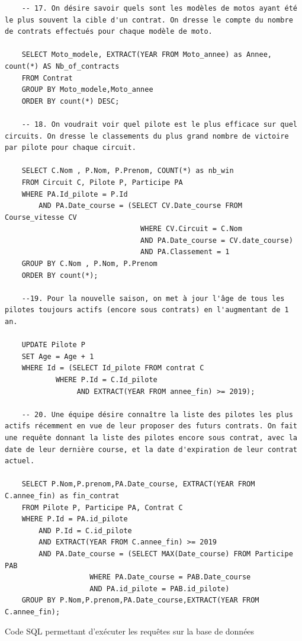 \documentclass[12pt,a4paper]{article}
\newenvironment{code}{\captionsetup{type=listing}}{}
\begin{document}
\begin{code}
\begin{verbatim}
    -- 17. On désire savoir quels sont les modèles de motos ayant été le plus souvent la cible d'un contrat. On dresse le compte du nombre de contrats effectués pour chaque modèle de moto.

    SELECT Moto_modele, EXTRACT(YEAR FROM Moto_annee) as Annee, count(*) AS Nb_of_contracts
    FROM Contrat
    GROUP BY Moto_modele,Moto_annee
    ORDER BY count(*) DESC;
    
    -- 18. On voudrait voir quel pilote est le plus efficace sur quel circuits. On dresse le classements du plus grand nombre de victoire par pilote pour chaque circuit.

    SELECT C.Nom , P.Nom, P.Prenom, COUNT(*) as nb_win
    FROM Circuit C, Pilote P, Participe PA
    WHERE PA.Id_pilote = P.Id
        AND PA.Date_course = (SELECT CV.Date_course FROM Course_vitesse CV
                                WHERE CV.Circuit = C.Nom
                                AND PA.Date_course = CV.date_course)
                                AND PA.Classement = 1
    GROUP BY C.Nom , P.Nom, P.Prenom
    ORDER BY count(*);
        
    --19. Pour la nouvelle saison, on met à jour l'âge de tous les pilotes toujours actifs (encore sous contrats) en l'augmentant de 1 an.

    UPDATE Pilote P
    SET Age = Age + 1
    WHERE Id = (SELECT Id_pilote FROM contrat C
            WHERE P.Id = C.Id_pilote
                 AND EXTRACT(YEAR FROM annee_fin) >= 2019);
                
    -- 20. Une équipe désire connaître la liste des pilotes les plus actifs récemment en vue de leur proposer des futurs contrats. On fait une requête donnant la liste des pilotes encore sous contrat, avec la date de leur dernière course, et la date d'expiration de leur contrat actuel.

    SELECT P.Nom,P.prenom,PA.Date_course, EXTRACT(YEAR FROM C.annee_fin) as fin_contrat
    FROM Pilote P, Participe PA, Contrat C
    WHERE P.Id = PA.id_pilote
        AND P.Id = C.id_pilote
        AND EXTRACT(YEAR FROM C.annee_fin) >= 2019
        AND PA.Date_course = (SELECT MAX(Date_course) FROM Participe PAB
                    WHERE PA.Date_course = PAB.Date_course
                    AND PA.id_pilote = PAB.id_pilote)
    GROUP BY P.Nom,P.prenom,PA.Date_course,EXTRACT(YEAR FROM C.annee_fin);
    \end{verbatim}
    \caption{Code SQL permettant d'exécuter les requêtes sur la base de données}
    \label{lst.request}
\end{code}
\end{document}
